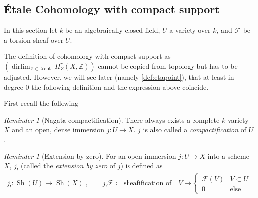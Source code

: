 \documentclass[english]{scrartcl}
\theoremstyle{definition}
\theoremstyle{remark}
\newtheorem{Rev}[Def]{Reminder}
\newcommand*{\Z}{\mathds{Z}}
\newcommand*{\F}{\mathcal{F}} %
\DeclareMathOperator*{\dirlim}{dirlim} %
\DeclareMathOperator{\Sh}{Sh} %
\begin{document}
\subsection{Étale Cohomology with compact support}
In this section let $k$ be an algebraically closed field,
$U$ a variety over $k$,
and $\F$ be a torsion sheaf over $U$.

The definition of cohomology with compact support as
$\left(\dirlim_{Z\subset X \text{cpt.}}H_Z^r(X,\Z)\right)$
cannot be copied from topology but has to be adjusted.
However, we will see later (namely \autoref{def:etapoint}),
that at least in degree 0 the following definition
and the expression above coincide.

First recall the following
\begin{Rev}[Nagata compactification]\label{nagata}
  There always exists a complete $k$-variety $X$ and an open, dense
  immersion $j\colon U\to X$. $j$ is also called a
  \emph{compactification} of $U$.
\end{Rev}
\begin{Rev}[Extension by zero]\label{def:extbyzero}
  For an open immersion $j\colon U\to X$ into
  a scheme $X$, $j_!$ (called the \emph{extension by zero} of $j$)
  is defined as
  \begin{gather*}
    j_!\colon \Sh(U)\to \Sh(X)\;,\qquad
    j_!\F \coloneqq \text{sheafification of}\quad
    V\mapsto\begin{cases}
      \F(V) & V\subset U\\
      0     & \text{else}
    \end{cases}
  \end{gather*}
\end{Rev}
\end{document}
